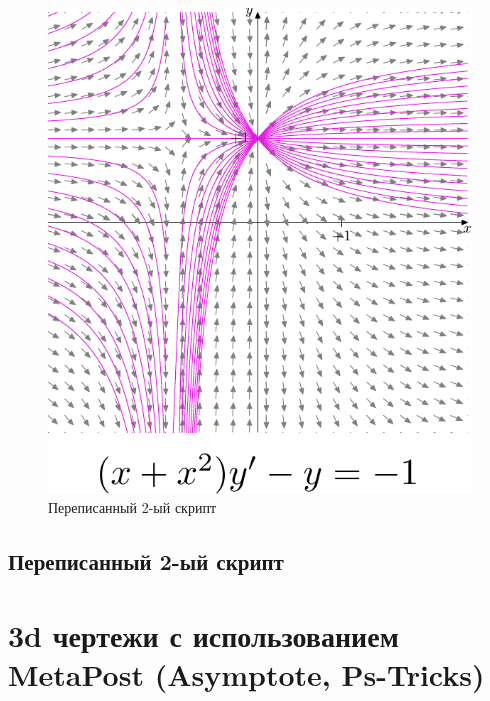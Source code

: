 \begin{figure}[h]
    \includegraphics{myfig2-1.pdf}
    \centering
    \caption{Переписанный 2-ый скрипт}
\end{figure}

\section*{Переписанный 2-ый скрипт}


\chapter{3d чертежи с использованием MetaPost (Asymptote, Ps-Tricks)}

